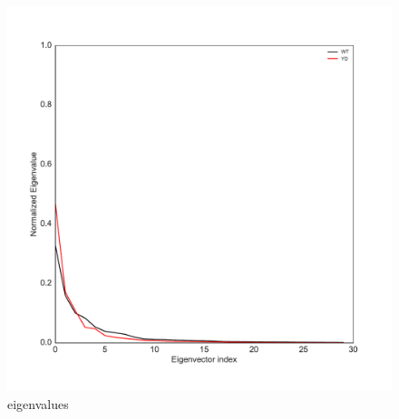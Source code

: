 \begin{figure}
\centering
	\includegraphics[height=0.5\textheight]{figures/eigenvals.pdf}
	\caption{eigenvalues}
	\label{fig:eigenvalues}
\end{figure}


